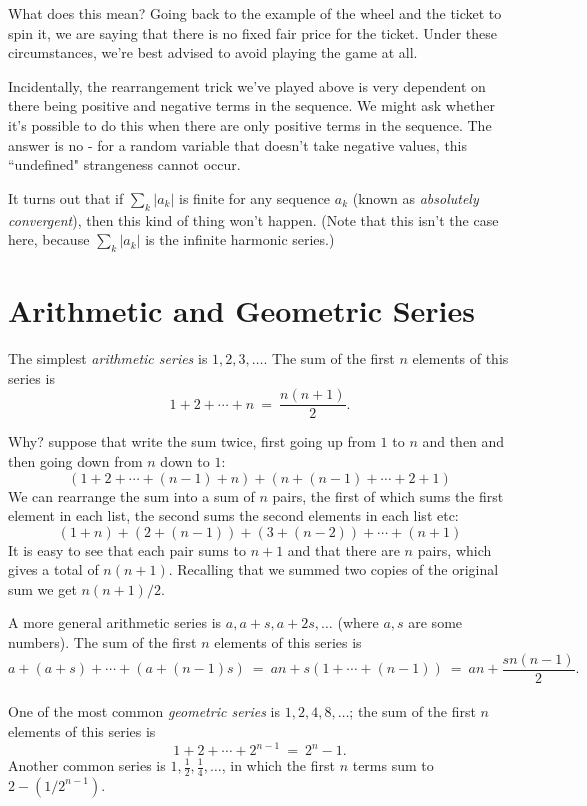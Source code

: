 What does this mean? 
Going back to the example of the wheel and the ticket to spin it, we are saying that there is no fixed fair price for the ticket. 
Under these circumstances, we're best advised to avoid playing the game at all.

Incidentally, the rearrangement trick we've played above is very dependent on there being positive and negative terms in the sequence. 
We might ask whether it's possible to do this when there are only positive terms in the sequence. 
The answer is no - for a random variable that doesn't take negative values, this ``undefined" strangeness cannot occur. 

It turns out that if $\sum_k |a_k|$ is finite for any sequence $a_k$ (known as \emph{absolutely convergent}), then this kind of thing won't happen. 
(Note that this isn't the case here, because $\sum_k |a_k|$ is the infinite harmonic series.)




\section{Arithmetic and Geometric Series}

The simplest {\it arithmetic series} is $1,2,3,\ldots$. The sum of the first 
$n$ elements of this series is
$$ 1 + 2 + \cdots + n \ = \ \frac{n(n+1)}{2} .$$

Why? suppose that write the sum twice, first going up from $1$ to $n$
and then and then going down from $n$ down to $1$:
$$ \left(1 + 2 + \cdots + (n-1) + n\right) + 
\left(n + (n-1) + \cdots + 2 + 1\right) $$
We can rearrange the sum into a sum of $n$ pairs, the first of which
sums the first element in each list, the second sums the second
elements in each list etc:
$$ (1+n) + (2+(n-1)) + (3+(n-2)) + \cdots + (n+1) $$
It is easy to see that each pair sums to $n+1$ and that there are $n$
pairs, which gives a total of $n(n+1)$. Recalling that we summed two
copies of the original sum we get $n(n+1)/2$.

A more general arithmetic series is $a, a+s, a+2s, \ldots$
(where $a,s$ are some numbers). The sum of the first $n$ elements of this series is
$$ a + (a+s) + \cdots + (a + (n-1)s)
\ = \ 
an + s(1 + \cdots + (n-1))
\ = \ 
an + \frac{sn(n-1)}{2}.
$$
\\

One of the most common {\it geometric series} is $1, 2, 4, 8, \ldots$; the sum
of the first $n$ elements of this series is
$$ 1 + 2 + \cdots + 2^{n-1} \ = \ 2^n - 1 .$$
Another common series is $1, \frac{1}{2}, \frac{1}{4}, \ldots$,
in which the first $n$ terms sum to $2 - (1/2^{n-1})$.

